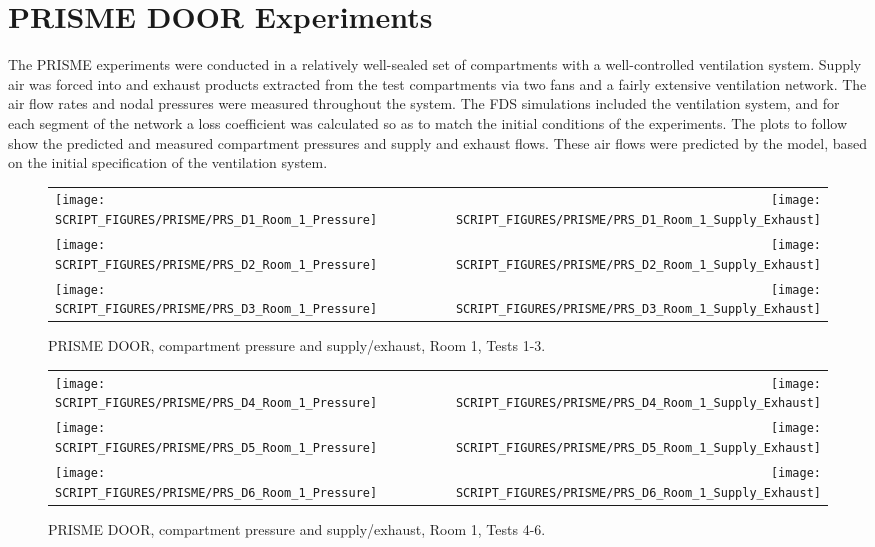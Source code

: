 \clearpage

\section{PRISME DOOR Experiments}

The PRISME experiments were conducted in a relatively well-sealed set of compartments with a well-controlled ventilation system. Supply air was forced into and exhaust products extracted from the test compartments via two fans and a fairly extensive ventilation network. The air flow rates and nodal pressures were measured throughout the system. The FDS simulations included the ventilation system, and for each segment of the network a loss coefficient was calculated so as to match the initial conditions of the experiments. The plots to follow show the predicted and measured compartment pressures and supply and exhaust flows. These air flows were predicted by the model, based on the initial specification of the ventilation system.

\newpage

\begin{figure}[p]
\begin{tabular*}{\textwidth}{l@{\extracolsep{\fill}}r}
\texttt{[image: SCRIPT\_FIGURES/PRISME/PRS\_D1\_Room\_1\_Pressure]} &
\texttt{[image: SCRIPT\_FIGURES/PRISME/PRS\_D1\_Room\_1\_Supply\_Exhaust]} \\
\texttt{[image: SCRIPT\_FIGURES/PRISME/PRS\_D2\_Room\_1\_Pressure]} &
\texttt{[image: SCRIPT\_FIGURES/PRISME/PRS\_D2\_Room\_1\_Supply\_Exhaust]} \\
\texttt{[image: SCRIPT\_FIGURES/PRISME/PRS\_D3\_Room\_1\_Pressure]} &
\texttt{[image: SCRIPT\_FIGURES/PRISME/PRS\_D3\_Room\_1\_Supply\_Exhaust]}
\end{tabular*}
\caption{PRISME DOOR, compartment pressure and supply/exhaust, Room 1, Tests 1-3.}
\label{PRISME_Room_1_Pressure_1-3}
\end{figure}

\newpage

\begin{figure}[p]
\begin{tabular*}{\textwidth}{l@{\extracolsep{\fill}}r}
\texttt{[image: SCRIPT\_FIGURES/PRISME/PRS\_D4\_Room\_1\_Pressure]} &
\texttt{[image: SCRIPT\_FIGURES/PRISME/PRS\_D4\_Room\_1\_Supply\_Exhaust]} \\
\texttt{[image: SCRIPT\_FIGURES/PRISME/PRS\_D5\_Room\_1\_Pressure]} &
\texttt{[image: SCRIPT\_FIGURES/PRISME/PRS\_D5\_Room\_1\_Supply\_Exhaust]} \\
\texttt{[image: SCRIPT\_FIGURES/PRISME/PRS\_D6\_Room\_1\_Pressure]} &
\texttt{[image: SCRIPT\_FIGURES/PRISME/PRS\_D6\_Room\_1\_Supply\_Exhaust]}
\end{tabular*}
\caption{PRISME DOOR, compartment pressure and supply/exhaust, Room 1, Tests 4-6.}
\label{PRISME_Room_1_Pressure_4-6}
\end{figure}

